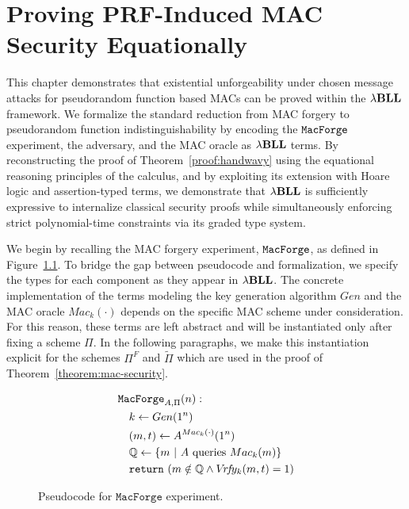 \chapter{Proving PRF-Induced MAC Security Equationally}\label{chapter:proof}
\lhead[\fancyplain{}{\bfseries\thepage}]{\fancyplain{}{\bfseries\rightmark}}
This chapter demonstrates that existential unforgeability under chosen message attacks for pseudorandom function based MACs can be proved within the ${\lambda}\mathbf{BLL}$ framework. We formalize the standard reduction from MAC forgery to pseudorandom function indistinguishability by encoding the $\mathtt{MacForge}$ experiment, the adversary, and the MAC oracle as ${\lambda}\mathbf{BLL}$ terms. By reconstructing the proof of Theorem~\ref{proof:handwavy} using the equational reasoning principles of the calculus, and by exploiting its extension with Hoare logic and assertion-typed terms, we demonstrate that ${\lambda}\mathbf{BLL}$ is sufficiently expressive to internalize classical security proofs while simultaneously enforcing strict polynomial-time constraints via its graded type system.

We begin by recalling the MAC forgery experiment, $\mathtt{MacForge}$, as defined in Figure~\ref{fig:macforge-recall}. To bridge the gap between pseudocode and formalization, we specify the types for each component as they appear in ${\lambda}\mathbf{BLL}$. The concrete implementation of the terms modeling the key generation
algorithm $\mathit{Gen}$ and the MAC oracle $\mathit{Mac}_k(\cdot)$ depends on the specific MAC scheme under consideration. For this reason, these terms are left abstract and will be instantiated only after fixing a scheme $\Pi$. In the following paragraphs, we make this instantiation explicit for the schemes $\Pi^F$ and $\widetilde{\Pi}$ which are used in the proof of Theorem~\ref{theorem:mac-security}. 

\begin{figure}[htpb]
    \centering
    \begin{align*}
    &\mathtt{MacForge}_{A,\Pi}(n): \\
    &\quad k \gets Gen(1^n) \\
    &\quad (m,t) \gets A^{Mac_k(\cdot)}(1^n) \\
    &\quad \mathbb{Q} \gets \{m \ | \ A \ \text{queries} \ Mac_k(m) \} \\
    &\quad \mathtt{return}\,\,(m \notin \mathbb{Q} \land V\!r\!f\!y_k(m,t) = 1)
    \end{align*}
    \caption{Pseudocode for $\mathtt{MacForge}$ experiment.}
    \label{fig:macforge-recall}
\end{figure}

